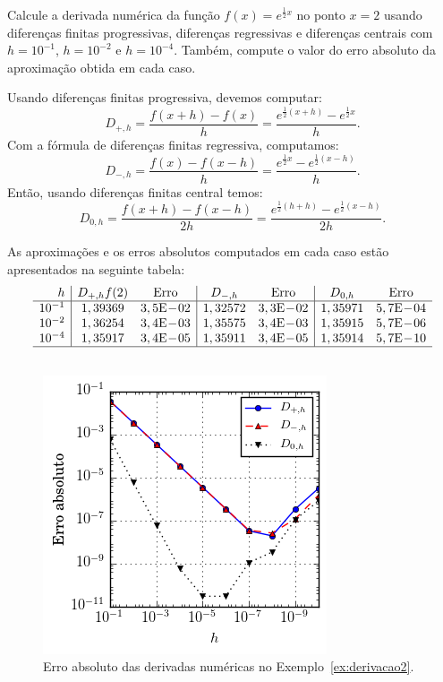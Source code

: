 \begin{ex}\label{ex:derivacao2}
Calcule a derivada numérica da função $f(x)=e^{\frac{1}{2}x}$ no ponto $x=2$ usando diferenças finitas progressivas, diferenças regressivas e diferenças centrais com $h=10^{-1}$, $h=10^{-2}$ e $h=10^{-4}$. Também, compute o valor do erro absoluto da aproximação obtida em cada caso.
\end{ex}
\begin{sol}
  Usando diferenças finitas progressiva, devemos computar:
  \begin{equation*}
    D_{+,h} = \frac{f(x+h) - f(x)}{h} = \frac{e^{\frac{1}{2}(x+h)} - e^{\frac{1}{2}x}}{h}.
  \end{equation*}
  Com a fórmula de diferenças finitas regressiva, computamos:
  \begin{equation*}
    D_{-,h} = \frac{f(x) - f(x-h)}{h} = \frac{e^{\frac{1}{2}x} - e^{\frac{1}{2}(x-h)}}{h}.
  \end{equation*}
  Então, usando diferenças finitas central temos:
  \begin{equation*}
    D_{0,h} = \frac{f(x+h) - f(x-h)}{2h} = \frac{e^{\frac{1}{2}(h+h)} - e^{\frac{1}{2}(x-h)}}{2h}.
  \end{equation*}

  As aproximações e os erros absolutos computados em cada caso estão apresentados na seguinte tabela:
  \begin{equation*}
    \begin{array}{r|cc|cc|cc}
      h  & D_{+,h}f(2) & \text{Erro} & D_{-,h} & \text{Erro} & D_{0,h} & \text{Erro} \\\hline
      10^{-1} & 1,39369 & 3,5\E-02   & 1,32572 & 3,3\E-02 & 1,35971 & 5,7\E-04\\
      10^{-2} & 1,36254 & 3,4\E-03   & 1,35575 & 3,4\E-03 & 1,35915 & 5,7\E-06\\
      10^{-4} & 1,35917 & 3,4\E-05   & 1,35911 & 3,4\E-05 & 1,35914 & 5,7\E-10\\\hline
      \multicolumn{7}{c}{}
    \end{array}
  \end{equation*}
\end{sol}

\begin{figure}
  \centering
  \includegraphics{./cap_derivacao/pics/ex_derivacao2/ex_derivacao2}
  \caption{Erro absoluto das derivadas numéricas no Exemplo~\ref{ex:derivacao2}.}
  \label{fig:ex_derivacao2}
\end{figure}


